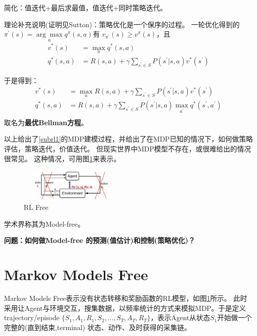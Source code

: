 \documentclass[UTF8]{ctexart}
\begin{document}
简化：值迭代+最后求最值，值迭代+同时策略迭代。

理论补充说明(证明见Sutton)：策略优化是一个保序的过程。
一轮优化得到的$\pi^{\prime}(s)=\underset{a}{\arg \max } q^{\pi}(s, a)$有
$v_{\pi^{\prime}}(s) \geq v^{\pi}(s)$，且
\begin{equation}
    \begin{aligned} v^{*}(s) &=\max _{a} q^{*}(s, a) \\ q^{*}(s, a)
        &=R(s, a)+\gamma \sum_{s^{\prime} \in S} P\left(s^{\prime} | s,
        a\right) v^{*}\left(s^{\prime}\right) \end{aligned}
\end{equation}

 于是得到：
 \begin{equation}
    \begin{aligned} v^{*}(s) &=\max _{a} R(s, a)  + \gamma \sum_{s^{\prime} \in S }P\left(s^{\prime} | s,
        a\right) v^{*}\left(s^{\prime}\right)\\ 
        q^{*}(s, a) &=R(s, a)+\gamma \sum_{s^{\prime} \in S} P\left(s^{\prime} | s,
        a\right) \max_{a^{\prime}} q^{*}(s^{\prime}, a^{\prime}) \\
    \end{aligned}
 \end{equation}
 取名为\textbf{最优Bellman方程}。

 以上给出了\ref{subrl1}的MDP建模过程，并给出了在MDP已知的情况下，如何做策略评估，策略迭代，价值迭代。
 但现实世界中MDP模型不存在，或很难给出的情况很常见。
这种情况，可用图\ref{subrl2}来表示。
 \begin{figure}[htbp]
	\centering
	\includegraphics[width=5cm, height=1.6cm]{./pic/rl_free.png}
    \caption{RL Free}
    \label{subrl2}
\end{figure}
学术界称其为Model-free。

\textbf{问题：如何做Model-free 的预测(值估计)和控制(策略优化)？}


\section{Markov Models Free}

Markov Models Free表示没有状态转移和奖励函数的RL模型，如图\ref{subrl2}所示。
此时采用让Agent与环境交互，搜集数据，以频率统计的方式来模拟MDP。于是定义trajectory/episode
$\{S_1, A_1, R_1, S_2, \ldots, S_T, A_T, R_T\}$，表示Agent从状态$S_1$开始做一个完整的(直到结束,terminal)
状态、动作、及时获得的采集链。
\end{document}
